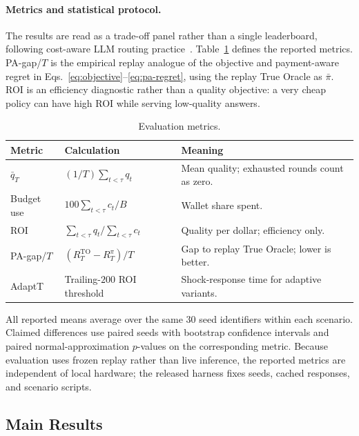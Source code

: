 \paragraph{Metrics and statistical protocol.}
The results are read as a trade-off panel rather than a single leaderboard, following cost-aware LLM routing practice~\citep{chen2023frugalgpt}. Table~\ref{tab:metrics} defines the reported metrics. PA-gap/$T$ is the empirical replay analogue of the objective and payment-aware regret in Eqs.~\eqref{eq:objective}--\eqref{eq:pa-regret}, using the replay True Oracle as $\bar\pi$. ROI is an efficiency diagnostic rather than a quality objective: a very cheap policy can have high ROI while serving low-quality answers.

\begin{table}[!htbp]
\centering
\caption{Evaluation metrics.}
\label{tab:metrics}
\scriptsize
\setlength{\tabcolsep}{2pt}
\begin{tabularx}{\linewidth}{@{}lXX@{}}
\toprule
Metric & Calculation & Meaning \\
\midrule
$\bar q_T$ & $(1/T)\sum_{t<\tau}q_t$ & Mean quality; exhausted rounds count as zero. \\
Budget use & $100\sum_{t<\tau}c_t/B$ & Wallet share spent. \\
ROI & $\sum_{t<\tau}q_t/\sum_{t<\tau}c_t$ & Quality per dollar; efficiency only. \\
PA-gap/$T$ & $(R^{\mathrm{TO}}_T-R^\pi_T)/T$ & Gap to replay True Oracle; lower is better. \\
AdaptT & Trailing-$200$ ROI threshold & Shock-response time for adaptive variants. \\
\bottomrule
\end{tabularx}
\end{table}

All reported means average over the same $30$ seed identifiers within each scenario. Claimed differences use paired seeds with bootstrap confidence intervals and paired normal-approximation $p$-values on the corresponding metric. Because evaluation uses frozen replay rather than live inference, the reported metrics are independent of local hardware; the released harness fixes seeds, cached responses, and scenario scripts.

\subsection{Main Results}
\label{sec:eval-main}

